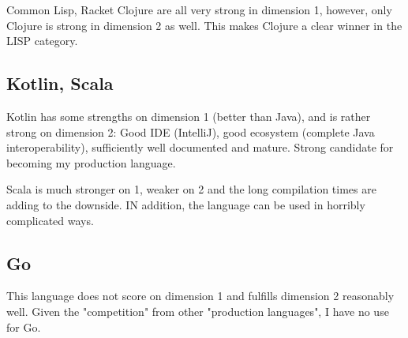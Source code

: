 Common Lisp, Racket Clojure are all very strong in dimension 1, however, only Clojure is strong in dimension 2 as well. This makes Clojure a clear winner in the LISP category.

\subsection{Kotlin, Scala}

Kotlin has some strengths on dimension 1 (better than Java), and is rather strong on dimension 2: Good IDE (IntelliJ), good ecosystem (complete Java interoperability), sufficiently well documented and mature. Strong candidate for becoming my production language.

Scala is much stronger on 1, weaker on 2 and the long compilation times are adding to the downside. IN addition, the language can be used in horribly complicated ways.

\subsection{Go}

This language does not score on dimension 1 and fulfills dimension 2 reasonably well. Given the "competition" from other "production languages", I have no use for Go.